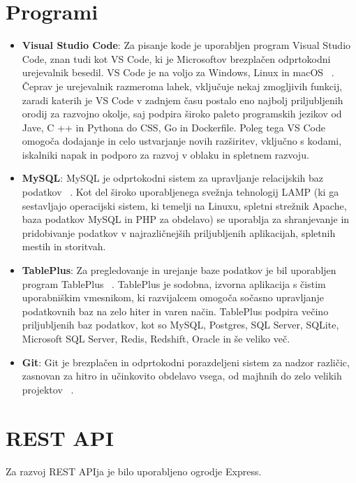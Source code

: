 \documentclass[a4paper, 12pt]{book}
\begin{document}
\section{Programi}
 \begin{itemize}
  \item \textbf{Visual Studio Code}: Za pisanje kode je uporabljen program Visual Studio Code, znan tudi kot VS Code, ki je Microsoftov brezplačen odprtokodni urejevalnik besedil. VS Code je na voljo za Windows, Linux in macOS  ~\cite{VSC}. Čeprav je urejevalnik razmeroma lahek, vključuje nekaj zmogljivih funkcij, zaradi katerih je VS Code v zadnjem času postalo eno najbolj priljubljenih orodij za razvojno okolje, saj podpira široko paleto programskih jezikov od Jave, C ++ in Pythona do CSS, Go in Dockerfile. Poleg tega VS Code omogoča dodajanje in celo ustvarjanje novih razširitev, vključno s kodami, iskalniki napak in podporo za razvoj v oblaku in spletnem razvoju.

 \item \textbf{MySQL}: MySQL je odprtokodni sistem za upravljanje relacijskih baz podatkov ~\cite{MySQL}. Kot del široko uporabljenega svežnja tehnologij LAMP (ki ga sestavljajo operacijski sistem, ki temelji na Linuxu, spletni strežnik Apache, baza podatkov MySQL in PHP za obdelavo) se uporablja za shranjevanje in pridobivanje podatkov v najrazličnejših priljubljenih aplikacijah, spletnih mestih in storitvah.

\item \textbf{TablePlus}: Za pregledovanje in urejanje baze podatkov je bil uporabljen program TablePlus  ~\cite{TablePlus}. TablePlus je sodobna, izvorna aplikacija s čistim uporabniškim vmesnikom, ki razvijalcem omogoča sočasno upravljanje podatkovnih baz na zelo hiter in varen način. TablePlus podpira večino priljubljenih baz podatkov, kot so MySQL, Postgres, SQL Server, SQLite, Microsoft SQL Server, Redis, Redshift, Oracle in še veliko več.

\item \textbf{Git}: Git je brezplačen in odprtokodni porazdeljeni sistem za nadzor različic, zasnovan za hitro in učinkovito obdelavo vsega, od majhnih do zelo velikih projektov ~\cite{Git}.
\end{itemize}


\section{REST API}
Za razvoj REST APIja je bilo uporabljeno ogrodje Express. 
\end{document}

